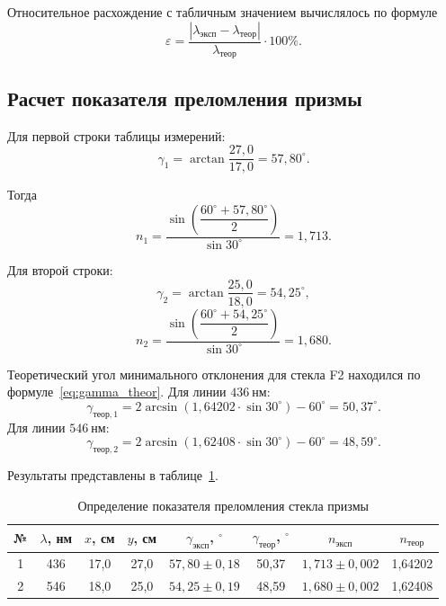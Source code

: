 \documentclass[a4paper,12pt]{article}
\begin{document}
Относительное расхождение с табличным значением вычислялось по формуле
\begin{equation}
    \varepsilon = \frac{|\lambda_{\text{эксп}}-\lambda_{\text{теор}}|}{\lambda_{\text{теор}}}\cdot100\%.
\end{equation}

\subsection{Расчет показателя преломления призмы}

Для первой строки таблицы измерений:
\begin{equation}
    \gamma_1=\arctan\frac{27{,}0}{17{,}0}=57{,}80^\circ.
\end{equation}

Тогда
\begin{equation}
    n_1=\frac{\sin\left(\dfrac{60^\circ+57{,}80^\circ}{2}\right)}{\sin30^\circ}=1{,}713.
\end{equation}

Для второй строки:
\begin{equation}
    \gamma_2=\arctan\frac{25{,}0}{18{,}0}=54{,}25^\circ,
\end{equation}
\begin{equation}
    n_2=\frac{\sin\left(\dfrac{60^\circ+54{,}25^\circ}{2}\right)}{\sin30^\circ}=1{,}680.
\end{equation}

Теоретический угол минимального отклонения для стекла F2 находился по формуле~\eqref{eq:gamma_theor}. Для линии $436~\text{нм}$:
\begin{equation}
    \gamma_{\text{теор},1}=2\arcsin\left(1{,}64202\cdot \sin30^\circ\right)-60^\circ=50{,}37^\circ.
\end{equation}
Для линии $546~\text{нм}$:
\begin{equation}
    \gamma_{\text{теор},2}=2\arcsin\left(1{,}62408\cdot \sin30^\circ\right)-60^\circ=48{,}59^\circ.
\end{equation}

Результаты представлены в таблице~\ref{tab:prism_results}.

\begin{table}[H]
\centering
\caption{Определение показателя преломления стекла призмы}
\label{tab:prism_results}
\begin{tabular}{|c|c|c|c|c|c|c|c|}
\hline
№ & $\lambda$, нм & $x$, см & $y$, см & $\gamma_{\text{эксп}}$, $^\circ$ & $\gamma_{\text{теор}}$, $^\circ$ & $n_{\text{эксп}}$ & $n_{\text{теор}}$ \\
\hline
1 & 436 & 17{,}0 & 27{,}0 & $57{,}80\pm0{,}18$ & 50{,}37 & $1{,}713\pm0{,}002$ & 1{,}64202 \\
\hline
2 & 546 & 18{,}0 & 25{,}0 & $54{,}25\pm0{,}19$ & 48{,}59 & $1{,}680\pm0{,}002$ & 1{,}62408 \\
\hline
\end{tabular}
\end{table}
\end{document}
